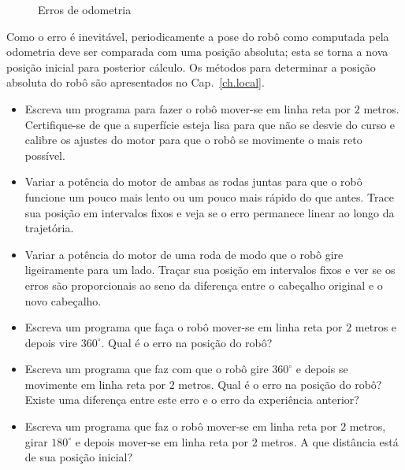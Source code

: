 {\begin{figure}
\begin{center}
\end{center}
\caption{Erros de odometria}\label{fig.odo-errors}
\end{figure}

Como o erro é inevitável, periodicamente a pose do robô como computada pela odometria deve ser comparada com uma posição absoluta; esta se torna a nova posição inicial para posterior cálculo. Os métodos para determinar a posição absoluta do robô são apresentados no Cap.~\ref{ch.local}.

\begin{framed}
\begin{itemize}
\item Escreva um programa para fazer o robô mover-se em linha reta por $2$ metros. Certifique-se de que a superfície esteja lisa para que não se desvie do curso e calibre os ajustes do motor para que o robô se movimente o mais reto possível.
\item Variar a potência do motor de ambas as rodas juntas para que o robô funcione um pouco mais lento ou um pouco mais rápido do que antes. Trace sua posição em intervalos fixos e veja se o erro permanece linear ao longo da trajetória.
\item Variar a potência do motor de uma roda de modo que o robô gire ligeiramente para um lado. Traçar sua posição em intervalos fixos e ver se os erros são proporcionais ao seno da diferença entre o cabeçalho original e o novo cabeçalho.
\end{itemize}
\end{framed}

\begin{framed}
\begin{itemize}
\item Escreva um programa que faça o robô mover-se em linha reta por $2$ metros e depois vire $360^\circ$. Qual é o erro na posição do robô?
\item Escreva um programa que faz com que o robô gire $360^\circ$ e depois se movimente em linha reta por $2$ metros. Qual é o erro na posição do robô? Existe uma diferença entre este erro e o erro da experiência anterior?
\item Escreva um programa que faz o robô mover-se em linha reta por $2$ metros, girar $180^\circ$ e depois mover-se em linha reta por $2$ metros. A que distância está de sua posição inicial?
\end{itemize}
\end{framed}

}
